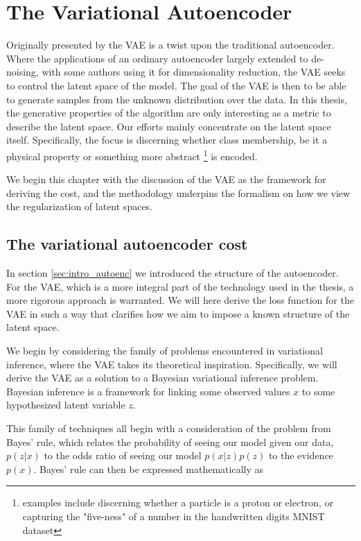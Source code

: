 \section{The Variational Autoencoder}\label{sec:vae}

Originally presented by \citet{Kingma2013} the VAE is a twist upon the traditional autoencoder. Where the applications of an ordinary autoencoder largely extended to de-noising, with some authors using it for dimensionality reduction, the VAE seeks to control the latent space of the model. The goal of the VAE is then to be able to generate samples from the unknown distribution over the data. In this thesis, the generative properties of the algorithm are only interesting as a metric to describe the latent space. Our efforts mainly concentrate on the latent space itself. Specifically, the focus is discerning whether class membership, be it a physical property or something more abstract \footnote{examples include discerning whether a particle is a proton or electron, or capturing the "five-ness" of a number in the handwritten digits MNIST dataset} is encoded.

We begin this chapter with the discussion of the VAE as the framework for deriving the cost, and the methodology underpins the formalism on how we view the regularization of latent spaces.

\subsection{The variational autoencoder cost}

In section \ref{sec:intro_autoenc} we introduced the structure of the autoencoder. For the VAE, which is a more integral part of the technology used in the thesis, a more rigorous approach is warranted. We will here derive the loss function for the VAE in such a way that clarifies how we aim to impose a known structure of the latent space.

We begin by considering the family of problems encountered in variational inference, where the VAE takes its theoretical inspiration. Specifically, we will derive the VAE  as a solution to a Bayesian variational inference problem. Bayesian inference is a framework for linking some observed values $x$ to some hypothesized latent variable $z$. 

This family of techniques all begin with a consideration of the problem from Bayes' rule, which relates the probability of seeing our model given our data, $p(z|x)$ to the odds ratio of seeing our model $p(x|z)p(z)$ to the evidence $p(x)$. Bayes' rule can then be expressed mathematically as 

